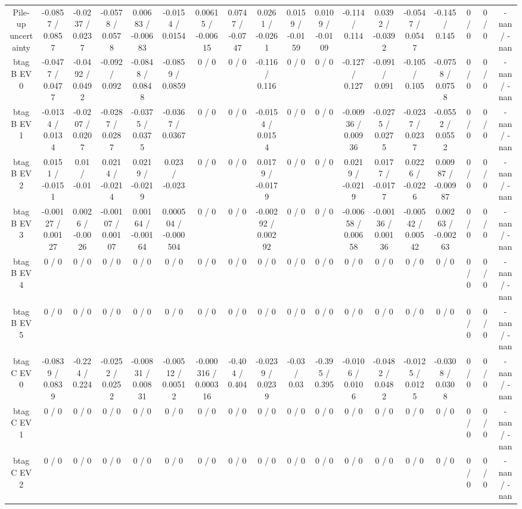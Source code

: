 \documentclass[10pt]{article}
\begin{document}
\begin{table}[htbp]
\begin{center}
\begin{tabular}{|c|c|c|c|c|c|c|c|c|c|c|c|c|c|c|c|c|c|}
  Pile-up uncertainty & -0.0857 / 0.0857 & -0.0237 / 0.0237 & -0.0578 / 0.0578 & 0.00683 / -0.00683 & -0.0154 / 0.0154 & 0.00615 / -0.00615 & 0.0747 / -0.0747 & 0.0261 / -0.0261 & 0.0159 / -0.0159 & 0.0109 / -0.0109 & -0.114 / 0.114 & 0.0392 / -0.0392 & -0.0547 / 0.0547 & -0.145 / 0.145 & 0 / 0 & 0 / 0 & -nan / -nan \\ 
  btag B EV 0 & -0.0477 / 0.0477 & -0.0492 / 0.0492 & -0.092 / 0.092 & -0.0848 / 0.0848 & -0.0859 / 0.0859 & 0 / 0 & 0 / 0 & -0.116 / 0.116 & 0 / 0 & 0 / 0 & -0.127 / 0.127 & -0.091 / 0.091 & -0.105 / 0.105 & -0.0758 / 0.0758 & 0 / 0 & 0 / 0 & -nan / -nan \\ 
  btag B EV 1 & -0.0134 / 0.0134 & -0.0207 / 0.0207 & -0.0287 / 0.0287 & -0.0375 / 0.0375 & -0.0367 / 0.0367 & 0 / 0 & 0 / 0 & -0.0154 / 0.0154 & 0 / 0 & 0 / 0 & -0.00936 / 0.00936 & -0.0275 / 0.0275 & -0.0237 / 0.0237 & -0.0552 / 0.0552 & 0 / 0 & 0 / 0 & -nan / -nan \\ 
  btag B EV 2 & 0.0151 / -0.0151 & 0.01 / -0.01 & 0.0214 / -0.0214 & 0.0219 / -0.0219 & 0.023 / -0.023 & 0 / 0 & 0 / 0 & 0.0179 / -0.0179 & 0 / 0 & 0 / 0 & 0.0219 / -0.0219 & 0.0177 / -0.0177 & 0.0226 / -0.0226 & 0.00987 / -0.00987 & 0 / 0 & 0 / 0 & -nan / -nan \\ 
  btag B EV 3 & -0.00127 / 0.00127 & 0.0026 / -0.0026 & -0.00107 / 0.00107 & 0.00164 / -0.00164 & 0.000504 / -0.000504 & 0 / 0 & 0 / 0 & -0.00292 / 0.00292 & 0 / 0 & 0 / 0 & -0.00658 / 0.00658 & -0.00136 / 0.00136 & -0.00542 / 0.00542 & 0.00263 / -0.00263 & 0 / 0 & 0 / 0 & -nan / -nan \\ 
  btag B EV 4 & 0 / 0 & 0 / 0 & 0 / 0 & 0 / 0 & 0 / 0 & 0 / 0 & 0 / 0 & 0 / 0 & 0 / 0 & 0 / 0 & 0 / 0 & 0 / 0 & 0 / 0 & 0 / 0 & 0 / 0 & 0 / 0 & -nan / -nan \\ 
  btag B EV 5 & 0 / 0 & 0 / 0 & 0 / 0 & 0 / 0 & 0 / 0 & 0 / 0 & 0 / 0 & 0 / 0 & 0 / 0 & 0 / 0 & 0 / 0 & 0 / 0 & 0 / 0 & 0 / 0 & 0 / 0 & 0 / 0 & -nan / -nan \\ 
  btag C EV 0 & -0.0839 / 0.0839 & -0.224 / 0.224 & -0.0252 / 0.0252 & -0.00831 / 0.00831 & -0.00512 / 0.00512 & -0.000316 / 0.000316 & -0.404 / 0.404 & -0.0239 / 0.0239 & -0.03 / 0.03 & -0.395 / 0.395 & -0.0106 / 0.0106 & -0.0482 / 0.0482 & -0.0125 / 0.0125 & -0.0308 / 0.0308 & 0 / 0 & 0 / 0 & -nan / -nan \\ 
  btag C EV 1 & 0 / 0 & 0 / 0 & 0 / 0 & 0 / 0 & 0 / 0 & 0 / 0 & 0 / 0 & 0 / 0 & 0 / 0 & 0 / 0 & 0 / 0 & 0 / 0 & 0 / 0 & 0 / 0 & 0 / 0 & 0 / 0 & -nan / -nan \\ 
  btag C EV 2 & 0 / 0 & 0 / 0 & 0 / 0 & 0 / 0 & 0 / 0 & 0 / 0 & 0 / 0 & 0 / 0 & 0 / 0 & 0 / 0 & 0 / 0 & 0 / 0 & 0 / 0 & 0 / 0 & 0 / 0 & 0 / 0 & -nan / -nan \\ 

\end{tabular}
\end{center}
\end{table}
\end{document}
